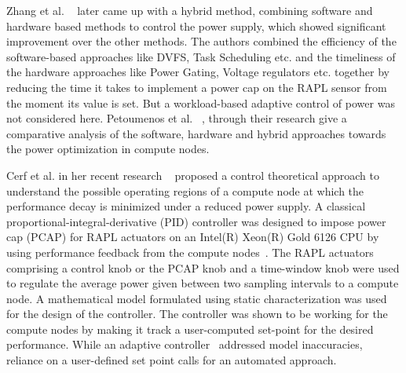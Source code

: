 Zhang et al. ~\cite{zhang2016maximizing} later came up with a hybrid method, combining software and hardware based methods to control the power supply, which showed significant improvement over the other methods. The authors combined the efficiency of the software-based approaches like DVFS, Task Scheduling etc. and the timeliness of the hardware approaches like Power Gating, Voltage regulators etc. together by reducing the time it takes to implement a power cap on the RAPL sensor from the moment its value is set. But a workload-based adaptive control of power was not considered here. Petoumenos et al. ~\cite{petoumenos2015power}, through their research give a comparative analysis of the software, hardware and hybrid approaches towards the power optimization in compute nodes.

Cerf et al. in her recent research  ~\cite{cerf2021sustaining} proposed a control theoretical approach to understand the possible operating regions of a compute node at which the performance decay is minimized under a reduced power supply. A classical proportional-integral-derivative (PID) controller was designed to impose power cap (PCAP) for RAPL actuators on an Intel(R) Xeon(R) Gold 6126 CPU by using performance feedback from the compute nodes~\cite{ramesh2019understanding}.
The RAPL actuators comprising a control knob or the PCAP knob and a time-window knob were used to regulate the average power given between two sampling intervals to a compute node. A mathematical model formulated using static characterization was used for the design of the controller. The controller was shown to be working for the compute nodes by making it track a user-computed set-point for the desired performance. While an adaptive controller~\cite{hawila:hal-03765849} addressed model inaccuracies, reliance on a user-defined set point calls for an automated approach.


